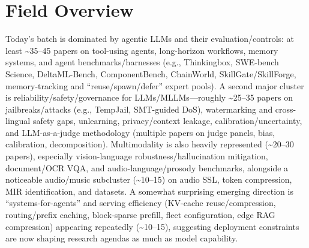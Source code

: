 \documentclass[12pt,letterpaper]{article}
\begin{document}
\medskip



\section*{Field Overview}
{\footnotesize Today's batch is dominated by agentic LLMs and their evaluation/controls: at least \textasciitilde{}35--45 papers on tool-using agents, long-horizon workflows, memory systems, and agent benchmarks/harnesses (e.g., Thinkingbox, SWE-bench Science, DeltaML-Bench, ComponentBench, ChainWorld, SkillGate/SkillForge, memory-tracking and ``reuse/spawn/defer'' expert pools). A second major cluster is reliability/safety/governance for LLMs/MLLMs---roughly \textasciitilde{}25--35 papers on jailbreaks/attacks (e.g., TempJail, SMT-guided DoS), watermarking and cross-lingual safety gaps, unlearning, privacy/context leakage, calibration/uncertainty, and LLM-as-a-judge methodology (multiple papers on judge panels, bias, calibration, decomposition). Multimodality is also heavily represented (\textasciitilde{}20--30 papers), especially vision-language robustness/hallucination mitigation, document/OCR VQA, and audio-language/prosody benchmarks, alongside a noticeable audio/music subcluster (\textasciitilde{}10--15) on audio SSL, token compression, MIR identification, and datasets. A somewhat surprising emerging direction is ``systems-for-agents'' and serving efficiency (KV-cache reuse/compression, routing/prefix caching, block-sparse prefill, fleet configuration, edge RAG compression) appearing repeatedly (\textasciitilde{}10--15), suggesting deployment constraints are now shaping research agendas as much as model capability.}
\end{document}
